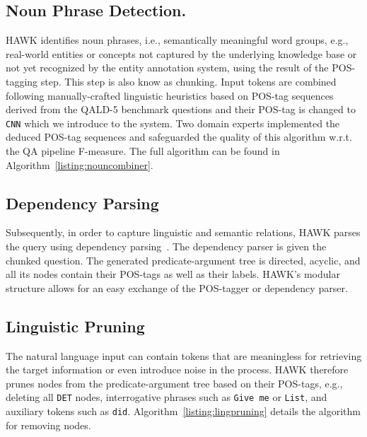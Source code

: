 \subsection{Noun Phrase Detection.}
HAWK identifies noun phrases, i.e., semantically meaningful word groups, e.g., real-world entities or concepts not captured by the underlying knowledge base or not yet recognized by the entity annotation system, using the result of the POS-tagging step. 
This step is also know as chunking. 
Input tokens are combined following manually-crafted linguistic heuristics based on POS-tag sequences derived from the \ac{QALD}-5 benchmark questions and their POS-tag is changed to \texttt{CNN} which we introduce to the system.
Two domain experts implemented the deduced POS-tag sequences and safeguarded the quality of this algorithm w.r.t. the \ac{QA} pipeline F-measure. 
The full algorithm can be found in Algorithm~\ref{listing:nouncombiner}.




\subsection{Dependency Parsing}

Subsequently, in order to capture linguistic and semantic relations, HAWK parses the query using dependency parsing~\cite{choi2011getting}.
The dependency parser is given the chunked question. 
The generated pre\-dicate-argument tree is directed, acyclic, and all its nodes contain their POS-tags as well as their labels.
HAWK's modular structure allows for an easy exchange of the POS-tagger or dependency parser.

\subsection{Linguistic Pruning}

The natural language input can contain tokens that are meaningless for retrieving the target information or even introduce noise in the process.
HAWK therefore prunes nodes from the predicate-argument tree based on their POS-tags, e.g., deleting all \texttt{DET} nodes, interrogative phrases such as \texttt{Give me} or \texttt{List}, and auxiliary tokens such as \texttt{did}.
Algorithm~\ref{listing:lingpruning} details the algorithm for removing nodes.




